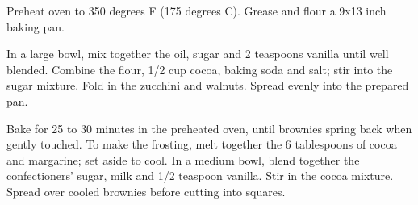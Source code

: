 
\info[servings=24,
		servingstext = portions,
		time = 45, 
		energy = 209,
		urlsource = http://allrecipes.com/recipe/25112/zucchini-brownies/]{}

\begin{ingredients}
\end{ingredients}

\begin{preparation}
	\step Preheat oven to 350 degrees F (175 degrees C). Grease and flour a 9x13 inch baking pan.
	
	\step In a large bowl, mix together the oil, sugar and 2 teaspoons vanilla until well blended. Combine the flour, 1/2 cup cocoa, baking soda and salt; stir into the sugar mixture. Fold in the zucchini and walnuts. Spread evenly into the prepared pan.
	
	\step Bake for 25 to 30 minutes in the preheated oven, until brownies spring back when gently touched. To make the frosting, melt together the 6 tablespoons of cocoa and margarine; set aside to cool. In a medium bowl, blend together the confectioners' sugar, milk and 1/2 teaspoon vanilla. Stir in the cocoa mixture. Spread over cooled brownies before cutting into squares.
\end{preparation}


\begin{notes}
\end{notes}


